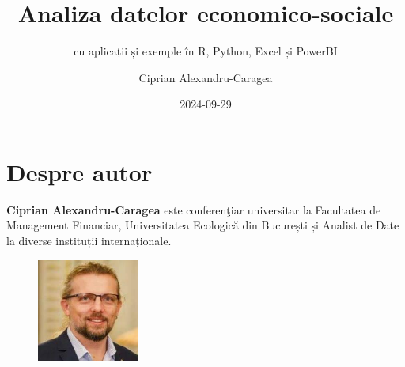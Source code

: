 \documentclass[
  11pt,
  b5paper,
  nottoc]{book}
\title{Analiza datelor economico-sociale}
\subtitle{cu aplicații și exemple în R, Python, Excel și PowerBI}
\author{Ciprian Alexandru-Caragea}
\date{2024-09-29}
\renewcommand{\contentsname}{Cuprins}
\renewcommand*\contentsname{Table of contents}
\newcommand\contentsname{Table of contents}
\begin{document}
\frontmatter
\maketitle
\ifdefined\Shaded\renewenvironment{Shaded}{\begin{tcolorbox}[sharp corners, breakable, boxrule=0pt, interior hidden, borderline west={3pt}{0pt}{shadecolor}, frame hidden, enhanced]}{\end{tcolorbox}}\fi

\renewcommand*\contentsname{Cuprins}
{
\setcounter{tocdepth}{1}
\tableofcontents
}
\listoffigures
\listoftables
\mainmatter
{}

\hypertarget{despre-autor}{%
\chapter*{Despre autor}\label{despre-autor}}


\setcounter{page}{3}

\textbf{Ciprian Alexandru-Caragea} este conferenţiar universitar la
Facultatea de Management Financiar, Universitatea Ecologică din
București și Analist de Date la diverse instituții internaționale.\\

\begin{figure}
  \begin{center}
    \includegraphics[width=0.3\textwidth]{images/Ciprian_DGINS2018.jpg}
  \end{center}
\end{figure}
\end{document}
